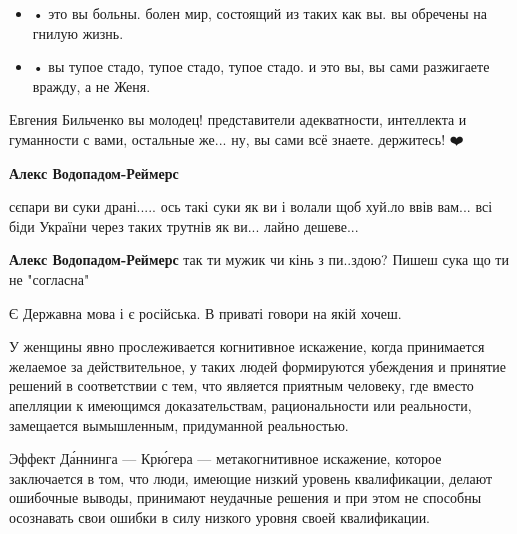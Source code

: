 \begin{itemize}
\begin{itemize}
  \item • это вы больны. болен мир, состоящий из таких как вы. вы обречены на гнилую жизнь.
  \item • вы тупое стадо, тупое стадо, тупое стадо. и это вы, вы сами разжигаете вражду, а не Женя.
\end{itemize}

Евгения Бильченко вы молодец! представители адекватности, интеллекта и
гуманности с вами, остальные же... ну, вы сами всё знаете.  держитесь! ❤️

\begin{itemize}

\textbf{Алекс Водопадом-Реймерс} 

сєпари ви суки драні..... ось такі суки як ви і волали щоб хуй.ло ввів вам...
всі біди України через таких трутнів як ви... лайно дешеве...


\textbf{Алекс Водопадом-Реймерс} так ти мужик чи кінь з пи..здою? Пишеш сука що ти не "согласна"
\end{itemize}



Є Державна мова і є російська. В приваті говори на якій хочеш.




У женщины явно прослеживается когнитивное искажение, когда принимается желаемое
за действительное, у таких людей формируются убеждения и принятие решений в
соответствии с тем, что является приятным человеку, где вместо апелляции к
имеющимся доказательствам, рациональности или реальности, замещается
вымышленным, придуманной реальностью.

Эффект Да́ннинга — Крю́гера — метакогнитивное искажение, которое заключается в
том, что люди, имеющие низкий уровень квалификации, делают ошибочные выводы,
принимают неудачные решения и при этом не способны осознавать свои ошибки в
силу низкого уровня своей квалификации.


\end{itemize}

